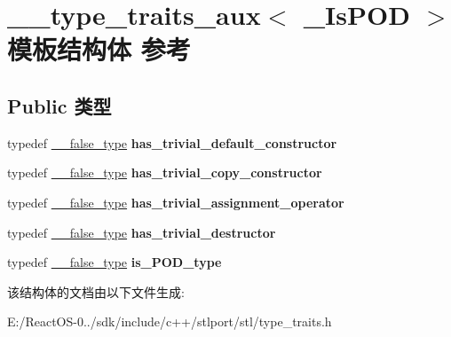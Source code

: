 \hypertarget{struct____type__traits__aux}{}\section{\+\_\+\+\_\+type\+\_\+traits\+\_\+aux$<$ \+\_\+\+Is\+P\+OD $>$ 模板结构体 参考}
\label{struct____type__traits__aux}
\subsection*{Public 类型}
\begin{DoxyCompactItemize}
\item 
\mbox{\label{struct____type__traits__aux_a5b728c84aeb4160c92f1c513e48325f2}} 
typedef \hyperlink{struct____false__type}{\+\_\+\+\_\+false\+\_\+type} {\bfseries has\+\_\+trivial\+\_\+default\+\_\+constructor}
\item 
\mbox{\label{struct____type__traits__aux_afa7edb58f6cb7b0df7befb018e79ed16}} 
typedef \hyperlink{struct____false__type}{\+\_\+\+\_\+false\+\_\+type} {\bfseries has\+\_\+trivial\+\_\+copy\+\_\+constructor}
\item 
\mbox{\label{struct____type__traits__aux_a2ef11e6bf58bc280cf91b059fb6a12fa}} 
typedef \hyperlink{struct____false__type}{\+\_\+\+\_\+false\+\_\+type} {\bfseries has\+\_\+trivial\+\_\+assignment\+\_\+operator}
\item 
\mbox{\label{struct____type__traits__aux_a6e5a13f8843c66534e0eca436242e384}} 
typedef \hyperlink{struct____false__type}{\+\_\+\+\_\+false\+\_\+type} {\bfseries has\+\_\+trivial\+\_\+destructor}
\item 
\mbox{\label{struct____type__traits__aux_a20c27f2c5098d88486061e35671976eb}} 
typedef \hyperlink{struct____false__type}{\+\_\+\+\_\+false\+\_\+type} {\bfseries is\+\_\+\+P\+O\+D\+\_\+type}
\end{DoxyCompactItemize}


该结构体的文档由以下文件生成\+:\begin{DoxyCompactItemize}
\item 
E\+:/\+React\+O\+S-\/0../sdk/include/c++/stlport/stl/type\+\_\+traits.\+h\end{DoxyCompactItemize}
